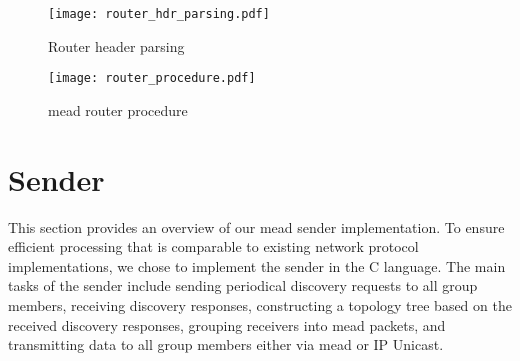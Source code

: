 %
\begin{figure}
    \begin{center}
        \texttt{[image: router\_hdr\_parsing.pdf]}
    \end{center}
    \caption{Router header parsing}
    \label{fig:router_hdr_parsing}
\end{figure}

\begin{figure}
    \begin{center}
        \texttt{[image: router\_procedure.pdf]}
    \end{center}
    \caption{\gls{mead} router procedure}
    \label{fig:router_procedure}
\end{figure}


\section{Sender} %
\label{sec:Sender}
This section provides an overview of our \gls{mead} sender implementation.
To ensure efficient processing that is comparable to existing network
    protocol implementations, we chose to implement the sender in the C
    language.
The main tasks of the sender include sending periodical discovery requests to
    all group members, receiving discovery responses, constructing a topology
    tree based on the received discovery responses, grouping receivers into
    \gls{mead} packets, and transmitting data to all group members either via
    \gls{mead} or IP Unicast.

